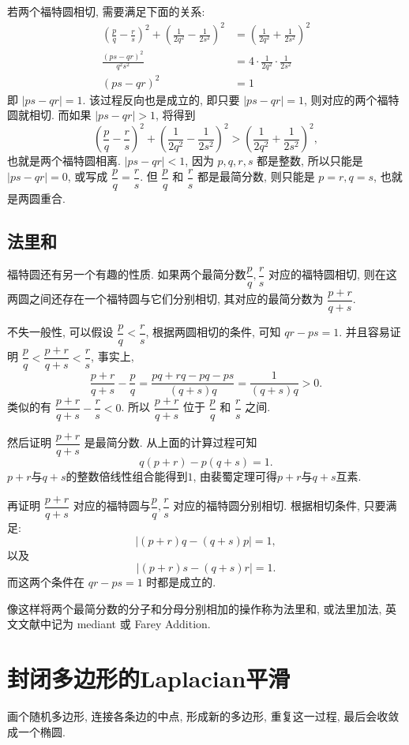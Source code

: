 若两个福特圆相切, 需要满足下面的关系:
\begin{align*}
\left(\frac{p}{q} - \frac{r}{s}\right)^2 + \left( \frac{1}{2q^2} - \frac{1}{2s^2} \right)^2 &= \left( \frac{1}{2q^2} + \frac{1}{2s^2} \right)^2 \\
\frac{(ps-qr)^2}{q^2s^2} &= 4\cdot \frac{1}{2q^2}\cdot\frac{1}{2s^2}\\
(ps-qr)^2 &= 1
\end{align*}
即 $|ps-qr| = 1$. 
该过程反向也是成立的,  即只要 $|ps-qr| = 1$, 则对应的两个福特圆就相切. 
而如果 $|ps-qr| > 1$, 将得到
$$ \left(\frac{p}{q} - \frac{r}{s}\right)^2 + \left( \frac{1}{2q^2} - \frac{1}{2s^2} \right)^2 > \left( \frac{1}{2q^2} + \frac{1}{2s^2} \right)^2 ,$$
也就是两个福特圆相离. $|ps-qr| < 1$, 因为 $p,q,r,s$ 都是整数, 所以只能是 $|ps-qr| = 0$, 或写成 $\dfrac{p}{q} = \dfrac{r}{s}$. 但 $\dfrac{p}{q}$ 和 $\dfrac{r}{s}$ 都是最简分数, 则只能是 $p=r, q=s$, 也就是两圆重合.


\subsection{法里和}
福特圆还有另一个有趣的性质. 如果两个最简分数$\dfrac{p}{q},\dfrac{r}{s}$ 对应的福特圆相切, 则在这两圆之间还存在一个福特圆与它们分别相切, 其对应的最简分数为 $\dfrac{p+r}{q+s}$. 

不失一般性, 可以假设 $\dfrac{p}{q} < \dfrac{r}{s}$, 根据两圆相切的条件, 可知 $qr - ps = 1$. 并且容易证明 $\dfrac{p}{q} < \dfrac{p+r}{q+s} < \dfrac{r}{s}$, 事实上, 
\[\frac{p+r}{q+s} - \frac{p}{q} = \frac{pq+rq-pq-ps}{(q+s)q} = \frac{1}{(q+s)q} > 0 .\]
类似的有 $\dfrac{p+r}{q+s} - \dfrac{r}{s} < 0$. 所以 $\dfrac{p+r}{q+s}$ 位于 $\dfrac{p}{q}$ 和 $\dfrac{r}{s}$ 之间.

然后证明 $\dfrac{p+r}{q+s}$ 是最简分数. 从上面的计算过程可知
\[ q(p+r) - p(q+s) = 1 .\]
$p+r$与$q+s$的整数倍线性组合能得到$1$, 由裴蜀定理可得$p+r$与$q+s$互素.

再证明 $\dfrac{p+r}{q+s}$ 对应的福特圆与$\dfrac{p}{q},\dfrac{r}{s}$ 对应的福特圆分别相切. 根据相切条件, 只要满足:
\[ |(p+r)q - (q+s)p| = 1 ,\]
以及
\[ |(p+r)s - (q+s)r| = 1  .\]
而这两个条件在 $qr - ps = 1$ 时都是成立的.

像这样将两个最简分数的分子和分母分别相加的操作称为法里和, 或法里加法, 英文文献中记为 mediant 或 Farey Addition.



\newpage
\section{封闭多边形的Laplacian平滑}
画个随机多边形, 连接各条边的中点, 形成新的多边形, 重复这一过程, 最后会收敛成一个椭圆.

